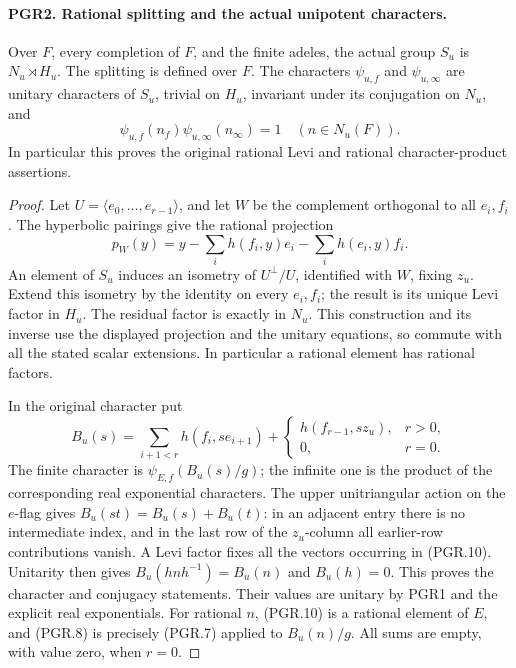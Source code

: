 \documentclass[11pt,a4paper]{article}
\numberwithin{equation}{section}
\theoremstyle{remark}\newtheorem{remark}[theorem]{Remark}
\begin{document}
\paragraph{PGR2. Rational splitting and the actual unipotent characters.}
\label{claim:PGR2}
Over \(F\), every completion of \(F\), and the finite adeles,
the actual group \(S_u\) is \(N_u\rtimes H_u\).  The splitting
is defined over \(F\).  The characters \(\psi_{u,f}\) and
\(\psi_{u,\infty}\) are unitary characters of \(S_u\), trivial
on \(H_u\), invariant under its conjugation on \(N_u\), and
\[
       \psi_{u,f}(n_f)\psi_{u,\infty}(n_\infty)=1
                           \quad(n\in N_u(F)).
\tag{PGR.8}
\]
In particular this proves the original rational Levi and rational
character-product assertions.
\begin{proof}
Let \(U=\langle e_0,\ldots,e_{r-1}\rangle\), and let \(W\)
be the complement orthogonal to all \(e_i,f_i\).  The hyperbolic
pairings give the rational projection
\[
 p_W(y)=y-\sum_i h(f_i,y)e_i-\sum_i h(e_i,y)f_i.
\tag{PGR.9}
\]
An element of \(S_u\) induces an isometry of \(U^\perp/U\),
identified with \(W\), fixing \(z_u\).  Extend this isometry
by the identity on every \(e_i,f_i\); the result is its unique
Levi factor in \(H_u\).  The residual factor is exactly in
\(N_u\).  This construction and its inverse use the displayed
projection and the unitary equations, so commute with all the stated
scalar extensions.  In particular a rational element has rational
factors.

In the original character put
\[
 B_u(s)=\sum_{i+1<r}h(f_i,se_{i+1})+
             \begin{cases}h(f_{r-1},sz_u),&r>0,\\0,&r=0.\end{cases}
\tag{PGR.10}
\]
The finite character is \(\psi_{E,f}(B_u(s)/g)\); the infinite
one is the product of the corresponding real exponential characters.
The upper unitriangular action on the \(e\)-flag gives
\(B_u(st)=B_u(s)+B_u(t)\): in an adjacent entry there is no
intermediate index, and in the last row of the \(z_u\)-column
all earlier-row contributions vanish.  A Levi factor fixes all the
vectors occurring in (PGR.10).  Unitarity then gives
\(B_u(hnh^{-1})=B_u(n)\) and \(B_u(h)=0\).
This proves the character and conjugacy statements.  Their values
are unitary by PGR1 and the explicit real exponentials.
For rational \(n\), (PGR.10) is a rational element of \(E\),
and (PGR.8) is precisely (PGR.7) applied to \(B_u(n)/g\).
All sums are empty, with value zero, when \(r=0\).
\end{proof}
\end{document}
